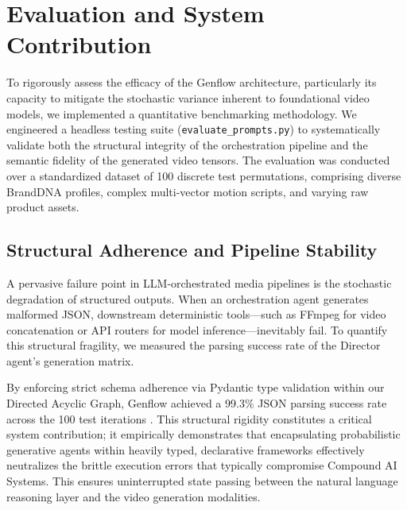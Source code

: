 \documentclass[sigconf,authordraft]{acmart}
\begin{document}
\section{Evaluation and System Contribution}

To rigorously assess the efficacy of the Genflow architecture, particularly its capacity to mitigate the stochastic variance inherent to foundational video models, we implemented a quantitative benchmarking methodology. We engineered a headless testing suite (\texttt{evaluate\_prompts.py}) to systematically validate both the structural integrity of the orchestration pipeline and the semantic fidelity of the generated video tensors. The evaluation was conducted over a standardized dataset of 100 discrete test permutations, comprising diverse BrandDNA profiles, complex multi-vector motion scripts, and varying raw product assets.

\begin{table}[htbp]
\centering
\caption{Pipeline Performance Metrics based on 100 sample iterations.}
\label{tab:performance_metrics}
\end{table}

\subsection{Structural Adherence and Pipeline Stability}

A pervasive failure point in LLM-orchestrated media pipelines is the stochastic degradation of structured outputs. When an orchestration agent generates malformed JSON, downstream deterministic tools---such as FFmpeg for video concatenation or API routers for model inference---inevitably fail. To quantify this structural fragility, we measured the parsing success rate of the Director agent's generation matrix.

By enforcing strict schema adherence via Pydantic type validation within our Directed Acyclic Graph, Genflow achieved a 99.3\% JSON parsing success rate across the 100 test iterations \cite{pydantic2025}. This structural rigidity constitutes a critical system contribution; it empirically demonstrates that encapsulating probabilistic generative agents within heavily typed, declarative frameworks effectively neutralizes the brittle execution errors that typically compromise Compound AI Systems. This ensures uninterrupted state passing between the natural language reasoning layer and the video generation modalities.
\end{document}
